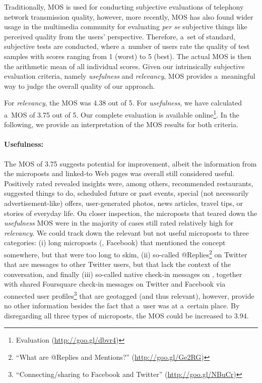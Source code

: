 Traditionally, MOS is used for conducting subjective evaluations
of telephony network transmission quality,
however, more recently, MOS has also found wider usage in the multimedia community
for evaluating \emph{per se} subjective things
like perceived quality from the users' perspective. 
Therefore, a~set of standard, subjective tests are conducted,
where a~number of users rate the quality of test samples
with scores ranging from 1 (worst) to 5 (best).
The actual MOS is then the arithmetic mean of all individual scores.
Given our intrinsically subjective evaluation criteria,
namely \emph{usefulness} and \emph{relevancy},
MOS provides a~meaningful way to judge the overall quality of our approach.

For \emph{relevancy}, the MOS was 4.38 out of 5.
For \emph{usefulness}, we have calculated a~MOS of 3.75 out of 5.
Our complete evaluation is available online\footnote{Evaluation (\url{http://goo.gl/dbvr4})}.
In the following, we provide an interpretation of the MOS results for both criteria.

\paragraph{Usefulness:}
The MOS of 3.75 suggests potential for improvement,
albeit the information from the microposts and linked-to Web pages
was overall still considered useful.
Positively rated revealed insights were, among others, recommended restaurants,
suggested things to do, scheduled future or past events,
special (not necessarily advertisement-like) offers, user-generated photos,
news articles, travel tips, or stories of everyday life.
On closer inspection, the microposts that teared down the \emph{usefulness} MOS
were in the majority of cases still rated relatively high for \emph{relevancy}.
We could track down the relevant but not useful microposts to three categories:
(i) long microposts (\googleplus, Facebook) that mentioned the concept somewhere,
but that were too long to skim,
(ii) so-called
@Replies\footnote{``What are @Replies and Mentions?'' (\url{http://goo.gl/Ge2RG})}
on Twitter that are messages to other Twitter users,
but that lack the context of the conversation, and finally
(iii) so-called native check-in messages on \googleplus,
together with shared Foursquare check-in messages on Twitter and Facebook
via connected user profiles\footnote{``Connecting/sharing to Facebook and Twitter'' (\url{http://goo.gl/NBuCr})}
that are geotagged (and thus relevant), however,
provide no other information besides the fact that a~user was at a~certain place.
By disregarding all three types of microposts, the MOS could be increased to 3.94.

